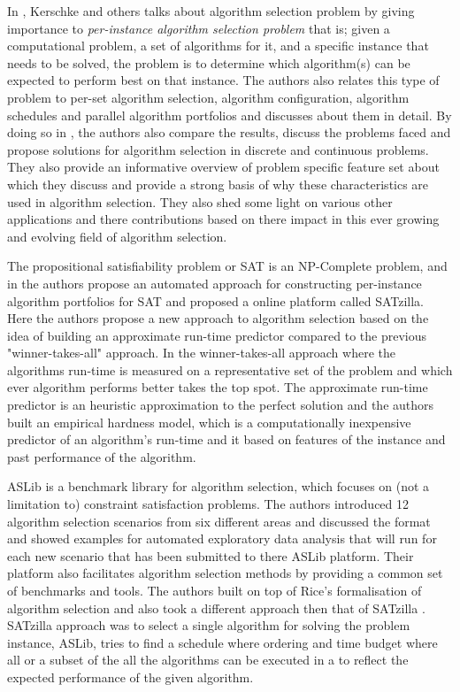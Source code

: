In \citep{kerschke2018automated}, Kerschke and others talks about algorithm selection problem by giving importance to \textit{per-instance algorithm selection problem} that is; given a computational problem, a set of algorithms for it, and a specific instance that needs to be solved, the problem is to determine which algorithm(s) can be expected to perform best on that instance. The authors also relates this type of problem to per-set algorithm selection, algorithm configuration, algorithm schedules and parallel algorithm portfolios and discusses about them in detail. By doing so in \citep{kerschke2018automated}, the authors also compare the results, discuss the problems faced and propose solutions for algorithm selection in discrete and continuous problems. They also provide an informative overview of problem specific feature set about which they discuss and provide a strong basis of why these characteristics are used in algorithm selection. They also shed some light on various other applications and there contributions based on there impact in this ever growing and evolving field of algorithm selection.

The propositional satisfiability problem or SAT is an NP-Complete problem, and in \citep{xu-et-al} the authors propose an automated approach for constructing per-instance algorithm portfolios for SAT and proposed a online platform called SATzilla. Here the authors propose a new approach to algorithm selection based on the idea of building an approximate run-time predictor compared to the previous "winner-takes-all" approach. In the winner-takes-all approach where the algorithms run-time is measured on a representative set of the problem and which ever algorithm performs better takes the top spot. The approximate run-time predictor is an heuristic approximation to the perfect solution and the authors built an empirical hardness model, which is a computationally inexpensive predictor of an algorithm’s run-time and it based on features of the instance and past performance of the algorithm.

ASLib \citep{bischl-et-al} is a benchmark library for algorithm selection, which focuses on (not a limitation to) constraint satisfaction problems. The authors introduced 12 algorithm selection scenarios from six diﬀerent areas and discussed the format and showed examples for automated exploratory data analysis that will run for each new scenario that has been submitted to there ASLib platform. Their platform also facilitates algorithm selection methods by providing a common set of benchmarks and tools. The authors built on top of Rice's \citep{rice197665} formalisation of algorithm selection and also took a different approach then that of SATzilla \citep{xu-et-al}. SATzilla approach was to select a single algorithm for solving the problem instance, ASLib, tries to find a schedule where ordering and time budget where all or a subset of the all the algorithms can be executed in a to reflect the expected performance of the given algorithm.

